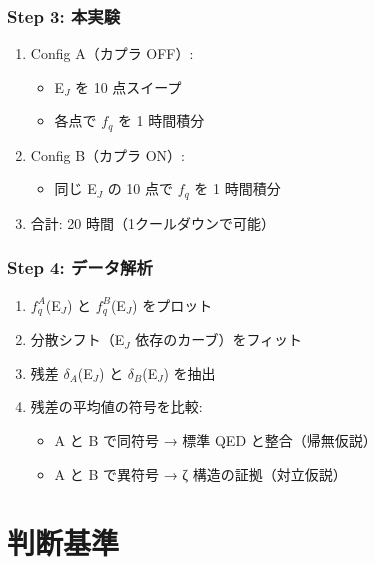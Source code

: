 \documentclass[12pt,a4paper]{article}
\begin{document}
\section{Step 3: 本実験}

\begin{expbox}[データ取得]
\begin{enumerate}
\item Config A（カプラ OFF）:
    \begin{itemize}
    \item E$_J$ を 10 点スイープ
    \item 各点で $f_q$ を 1 時間積分
    \end{itemize}

\item Config B（カプラ ON）:
    \begin{itemize}
    \item 同じ E$_J$ の 10 点で $f_q$ を 1 時間積分
    \end{itemize}

\item 合計: 20 時間（1クールダウンで可能）
\end{enumerate}
\end{expbox}

\section{Step 4: データ解析}

\begin{expbox}[解析]
\begin{enumerate}
\item $f_q^A$(E$_J$) と $f_q^B$(E$_J$) をプロット
\item 分散シフト（E$_J$ 依存のカーブ）をフィット
\item 残差 $\delta_A$(E$_J$) と $\delta_B$(E$_J$) を抽出
\item 残差の平均値の符号を比較:
    \begin{itemize}
    \item A と B で同符号 → 標準 QED と整合（帰無仮説）
    \item A と B で異符号 → ζ 構造の証拠（対立仮説）
    \end{itemize}
\end{enumerate}
\end{expbox}

\part{判断基準}
\end{document}
